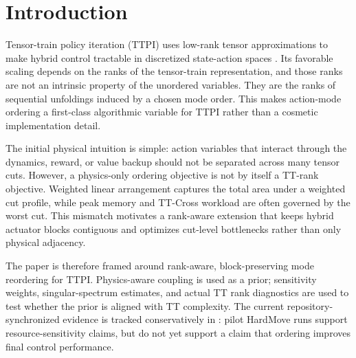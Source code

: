 \section{Introduction}

Tensor-train policy iteration (TTPI) uses low-rank tensor approximations to make
hybrid control tractable in discretized state-action spaces
\cite{shetty2024generalized,oseledets2011tensor}. Its favorable scaling depends
on the ranks of the tensor-train representation, and those ranks are not an
intrinsic property of the unordered variables. They are the ranks of sequential
unfoldings induced by a chosen mode order. This makes action-mode ordering a
first-class algorithmic variable for TTPI rather than a cosmetic implementation
detail.

The initial physical intuition is simple: action variables that interact through
the dynamics, reward, or value backup should not be separated across many tensor
cuts. However, a physics-only ordering objective is not by itself a TT-rank
objective. Weighted linear arrangement captures the total area under a weighted
cut profile, while peak memory and TT-Cross workload are often governed by the
worst cut. This mismatch motivates a rank-aware extension that keeps hybrid
actuator blocks contiguous and optimizes cut-level bottlenecks rather than only
physical adjacency.

The paper is therefore framed around rank-aware, block-preserving mode
reordering for TTPI. Physics-aware coupling is used as a prior; sensitivity
weights, singular-spectrum estimates, and actual TT rank diagnostics are used to
test whether the prior is aligned with TT complexity. The current
repository-synchronized evidence is tracked conservatively in
: pilot HardMove runs support resource-sensitivity
claims, but do not yet support a claim that ordering improves final control
performance.
